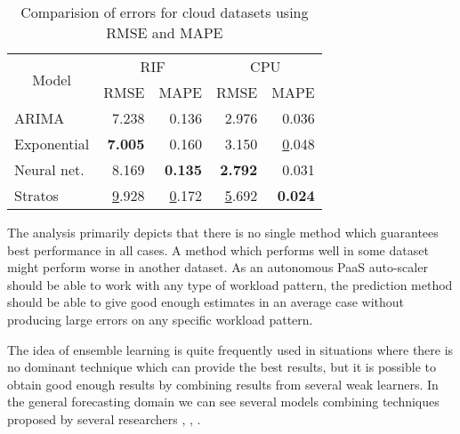\begin{table}[]
\centering
\caption{Comparision of errors for cloud datasets using RMSE and MAPE}
\begin{tabular}{|l|r|r|r|r|}
\hline
\multicolumn{1}{|c|}{\multirow{2}{*}{Model}} & \multicolumn{2}{c|}{RIF}                              & \multicolumn{2}{c|}{CPU}                              \\ \cline{2-5} 
\multicolumn{1}{|c|}{}                       & \multicolumn{1}{c|}{RMSE} & \multicolumn{1}{c|}{MAPE} & \multicolumn{1}{c|}{RMSE} & \multicolumn{1}{c|}{MAPE} \\ \hline
ARIMA                                        & 7.238                     & 0.136                     & 2.976                     & 0.036                     \\ \hline
Exponential                                  & \textbf{7.005}                     & 0.160                     & 3.150                     & {\ul 0.048}               \\ \hline
Neural net.                                  & 8.169                     & \textbf{0.135}                     & \textbf{2.792}            & 0.031                     \\ \hline
Stratos                                      & {\ul 9.928}               & {\ul 0.172}               & {\ul 5.692}               & \textbf{0.024}            \\ \hline
\end{tabular}
\end{table}
The analysis primarily depicts that there is no single method which guarantees best performance in all cases. A method which performs well in some dataset might perform worse in another dataset. As an autonomous PaaS auto-scaler should be able to work with any type of workload pattern, the prediction method should be able to give good enough estimates in an average case without producing large errors on any specific workload pattern.

The idea of ensemble learning is quite frequently used in situations where there is no dominant technique which can provide the best results, but it is possible to obtain good enough results by combining results from several weak learners. In the general forecasting domain we can see several models combining techniques proposed by several researchers \cite{Wagner_2011}, \cite{Zhang_2003}, \cite{Zou_2004}.

